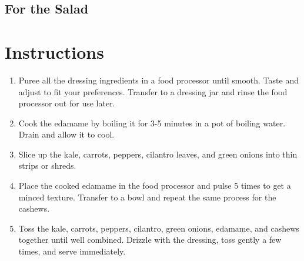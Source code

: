 \documentclass[ansiapaper,10pt,english]{sphinxmanual}
\begin{document}
\subsection{For the Salad}
\label{\detokenize{Power_Salad:for-the-salad}}
%
\begin{sphinxVerbatim}[commandchars=\\\{\}]
    

   

  

      

   

  

      
\end{sphinxVerbatim}


\section{Instructions}
\label{\detokenize{Power_Salad:instructions}}\begin{enumerate}
\item {} 
Puree all the dressing ingredients in a food processor until smooth. Taste and adjust to fit your preferences. Transfer to a dressing jar and rinse the food processor out for use later.

\item {} 
Cook the edamame by boiling it for 3-5 minutes in a pot of boiling water. Drain and allow it to cool.

\item {} 
Slice up the kale, carrots, peppers, cilantro leaves, and green onions into thin strips or shreds.

\item {} 
Place the cooked edamame in the food processor and pulse 5 times to get a minced texture. Transfer to a bowl and repeat the same process for the cashews.

\item {} 
Toss the kale, carrots, peppers, cilantro, green onions, edamame, and cashews together until well combined. Drizzle with the dressing, toss gently a few times, and serve immediately.

\end{enumerate}
\end{document}
